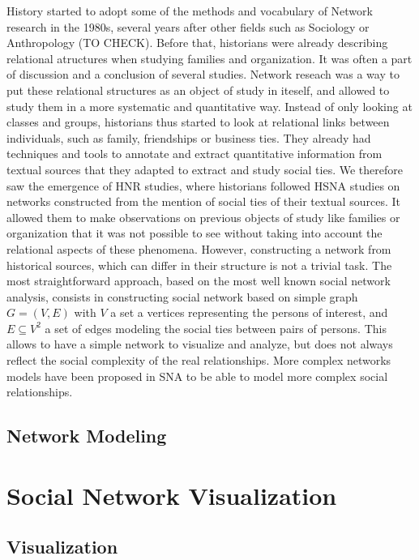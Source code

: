 History started to adopt some of the methods and vocabulary of Network research in the 1980s, several years after other fields such as Sociology or Anthropology (TO CHECK). Before that, historians were already describing relational atructures when studying families and organization. It was often a part of discussion and a conclusion of several studies.
Network reseach was a way to put these relational structures as an object of study in iteself, and allowed to study them in a more systematic and quantitative way.
Instead of only looking at classes and groups, historians thus started to look at relational links between individuals, such as family, friendships or business ties.
They already had techniques and tools to annotate and extract quantitative information from textual sources that they adapted to extract and study social ties.
We therefore saw the emergence of HNR studies, where historians followed HSNA studies on networks constructed from the mention of social ties of their textual sources.
It allowed them to make observations on previous objects of study like families or organization that it was not possible to see without taking into account the relational aspects of these phenomena.
However, constructing a network from historical sources, which can differ in their structure is not a trivial task. The most straightforward approach, based on the most well known social network analysis, consists in constructing social network based on simple graph $G = (V, E)$ with $V$ a set a vertices representing the persons of interest, and $E \subseteq V^2$ a set of edges modeling the social ties between pairs of persons.
This allows to have a simple network to visualize and analyze, but does not always reflect the social complexity of the real relationships.
More complex networks models have been proposed in SNA to be able to model more complex social relationships.

\subsection{Network Modeling}





\section{Social Network Visualization}



\subsection{Visualization}

